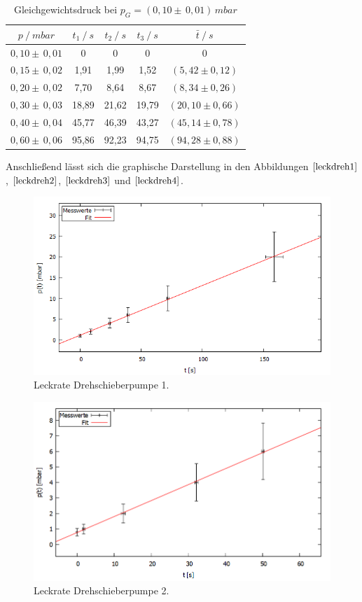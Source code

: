 \begin{table}[H]
\centering
\label{tab:leck_Dreh4}
\begin{tabular}{c|c|c|c|c}
	{$p \:/\: \si{mbar}$} & {$t_1 \:/\: \si{s} $} & {$t_2 \:/\: \si{s} $} & {$t_3 \:/\: \si{s} $} & {$\bar{t} \:/\: \si{s}$}\\
\midrule
$0,10 \pm \, 0,01$ &0 &0 &0 &0\\
$0,15 \pm \, 0,02$ &   1,91 &  1,99 &  1,52 & $(5,42 \pm 0,12)$\\
$0,20 \pm \, 0,02$ &   7,70  &  8,64 &  8,67 & $(8,34 \pm 0,26) $\\
$0,30 \pm \, 0,03$ &   18,89 &  21,62 &  19,79 & $(20,10 \pm 0,66) $\\
$0,40 \pm \, 0,04$ &   45,77 &  46,39 & 43,27 & $(45,14 \pm 0,78) $\\
$0,60 \pm \, 0,06$ &   95,86 &  92,23 &  94,75 & $(94,28 \pm 0,88) $\\
\end{tabular}
\caption{Gleichgewichtsdruck bei $p_G=(0,10 \pm \, 0,01) \, \si{mbar}$}
\end{table}
Anschließend lässt sich die graphische Darstellung in den Abbildungen $\ref{leckdreh1}$, $\ref{leckdreh2}$, $\ref{leckdreh3}$ und $\ref{leckdreh4}$.
\begin{figure}[H]
  \centering
  \includegraphics[width=14cm]{bilder/leckdrehfit1.png}
  \caption{Leckrate Drehschieberpumpe 1.}
  \label{leckdreh1}
\end{figure}
\begin{figure}[H]
  \centering
  \includegraphics[width=14cm]{bilder/leckdrehfit2.png}
  \caption{Leckrate Drehschieberpumpe 2.}
  \label{leckdreh2}
\end{figure}
